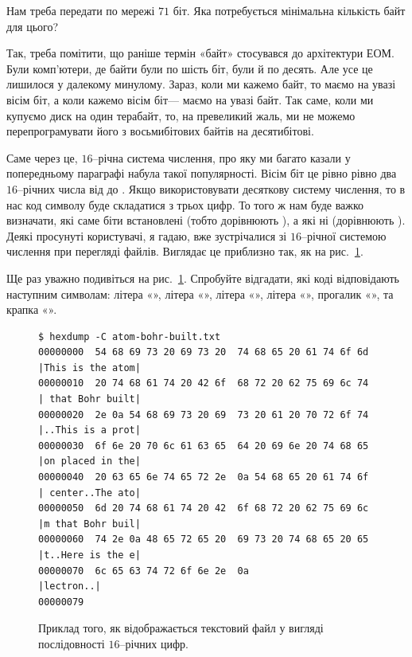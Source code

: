 \begin{exercise}
Нам треба передати по мережі $71$ біт. Яка потребується мінімальна кількість байт для цього?
\end{exercise}

Так, треба помітити, що раніше термін «байт» стосувався до архітектури ЕОМ.
Були комп'ютери, де байти були по шість біт, були й по десять.
Але усе це лишилося у далекому минулому.
Зараз, коли ми кажемо байт, то маємо на увазі вісім біт, а коли кажемо вісім біт--- маємо на увазі байт.
Так саме, коли ми купуємо диск на один терабайт, то, на превеликий жаль, ми не можемо перепрограмувати його з восьмибітових байтів на десятибітові.

Саме через це, $16$--річна система числення, про яку ми багато казали у попередньому параграфі набула такої популярності.
Вісім біт це рівно рівно два $16$--річних числа від  до .
Якщо використовувати десяткову систему числення, то в нас код символу буде складатися з трьох цифр.
То того ж нам буде важко визначати, які саме біти встановлені (тобто дорівнюють ), а які ні (дорівнюють ).
Деякі просунуті користувачі, я гадаю, вже зустрічалися зі $16$--річної системою числення при перегляді файлів.
Виглядає це приблизно так, як на рис.~\ref{PicHexDump}.

\begin{exercise}
Ще раз уважно подивіться на рис.~\ref{PicHexDump}. Спробуйте відгадати, які коді відповідають наступним символам:
літера «»,
літера «»,
літера «»,
літера «»,
прогалик «\bitstr{~}»,
та крапка «».
\end{exercise}

\begin{figure}[t]
  \centering
    \begin{Verbatim}[fontsize=\footnotesize,frame=single]
$ hexdump -C atom-bohr-built.txt
00000000  54 68 69 73 20 69 73 20  74 68 65 20 61 74 6f 6d  |This is the atom|
00000010  20 74 68 61 74 20 42 6f  68 72 20 62 75 69 6c 74  | that Bohr built|
00000020  2e 0a 54 68 69 73 20 69  73 20 61 20 70 72 6f 74  |..This is a prot|
00000030  6f 6e 20 70 6c 61 63 65  64 20 69 6e 20 74 68 65  |on placed in the|
00000040  20 63 65 6e 74 65 72 2e  0a 54 68 65 20 61 74 6f  | center..The ato|
00000050  6d 20 74 68 61 74 20 42  6f 68 72 20 62 75 69 6c  |m that Bohr buil|
00000060  74 2e 0a 48 65 72 65 20  69 73 20 74 68 65 20 65  |t..Here is the e|
00000070  6c 65 63 74 72 6f 6e 2e  0a                       |lectron..|
00000079\end{Verbatim}
  \caption{Приклад того, як відображається текстовий файл у вигляді послідовності $16$--річних цифр.}
  \label{PicHexDump}
\end{figure}

